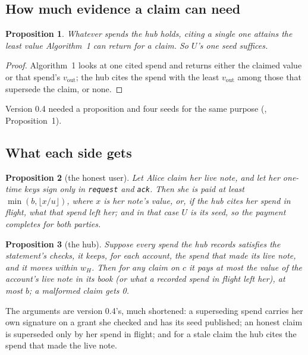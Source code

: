 \documentclass[11pt]{article}
\theoremstyle{plain}
\newtheorem{proposition}{Proposition}
\theoremstyle{definition}
\newcommand{\tx}[1]{\texttt{#1}}
\newcommand{\vout}{v_{\mathrm{out}}}
\begin{document}
\subsection{How much evidence a claim can need}\label{sec:volume}

\begin{proposition}\label{prop:volume}
Whatever spends the hub holds, citing a single one attains the least
value Algorithm~1 can return for a claim. So $U$'s one seed suffices.
\end{proposition}
\begin{proof}
Algorithm~1 looks at one cited spend and returns either the claimed
value or that spend's $\vout$; the hub cites the spend with the least
$\vout$ among those that supersede the claim, or none.
\end{proof}

Version 0.4 needed a proposition and four seeds for the same purpose
(\cite{grants04}, Proposition~1).

\subsection{What each side gets}\label{sec:who}

\begin{proposition}[the honest user]\label{prop:user}
Let Alice claim her live note, and let her one-time keys sign only in
\tx{request} and \tx{ack}. Then she is paid at least $\min(b, \lfloor
x/u \rfloor)$, where $x$ is her note's value, or, if the hub cites her
spend in flight, what that spend left her; and in that case $U$ is its
seed, so the payment completes for both parties.
\end{proposition}

\begin{proposition}[the hub]\label{prop:hub}
Suppose every spend the hub records satisfies the statement's checks,
it keeps, for each account, the spend that made its live note, and it
moves within $w_H$. Then for any claim on $c$ it pays at most the value
of the account's live note in its book (or what a recorded spend in
flight left her), at most $b$; a malformed claim gets 0.
\end{proposition}

The arguments are version 0.4's, much shortened: a superseding spend
carries her own signature on a grant she checked and has its seed
published; an honest claim is superseded only by her spend in flight;
and for a stale claim the hub cites the spend that made the live note.
\end{document}

